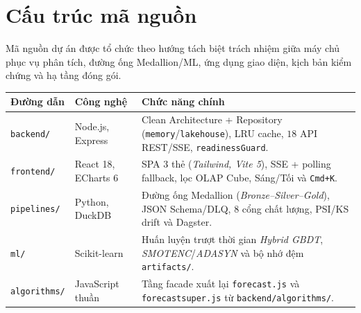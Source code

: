 \newpage\part*{Cấu trúc mã nguồn}
\noindent
\begin{minipage}[c]{0.6\textwidth}
	\small
	Mã nguồn dự án được tổ chức theo hướng tách biệt trách nhiệm giữa máy chủ phục vụ phân tích, đường ống Medallion/ML, ứng dụng giao diện, kịch bản kiểm chứng và hạ tầng đóng gói.
	\begin{table}[H]
		\centering
		\scriptsize
		\setlength{\tabcolsep}{3.5pt}
		\begin{tabular}{p{2.5cm} p{1.6cm} p{5.0cm}}
			\toprule
			\textbf{Đường dẫn}                                                                                                   & \textbf{Công nghệ}             & \textbf{Chức năng chính}                                                                                                                                               \\
			\midrule
			\texttt{backend/}                                                                                          & Node.js, Express               & Clean Architecture + Repository (\texttt{memory}/\texttt{lakehouse}), LRU cache, $18$ API REST/SSE, \texttt{readinessGuard}. \\
			\texttt{frontend/}                                                                                         & React 18, ECharts 6            & SPA $3$ thẻ (\textit{Tailwind, Vite 5}), SSE + polling fallback, lọc OLAP Cube, Sáng/Tối và \texttt{Cmd+K}.                                                            \\
			\texttt{pipelines/}                                                                                        & Python, DuckDB                 & Đường ống Medallion (\textit{Bronze--Silver--Gold}), JSON Schema/DLQ, $8$ cổng chất lượng, PSI/KS drift và Dagster.                                                    \\
			\texttt{ml/}                                                                                               & Scikit-learn                   & Huấn luyện trượt thời gian \textit{Hybrid GBDT}, \textit{SMOTENC}/\textit{ADASYN} và bộ nhớ đệm \texttt{artifacts/}.                                         \\
			\texttt{algorithms/}                                                                                       & JavaScript thuần               & Tầng facade xuất lại \texttt{forecast.js} và \texttt{forecastsuper.js} từ \texttt{backend/algorithms/}.                                  \\

\end{tabular}
\end{table}
\end{minipage}

